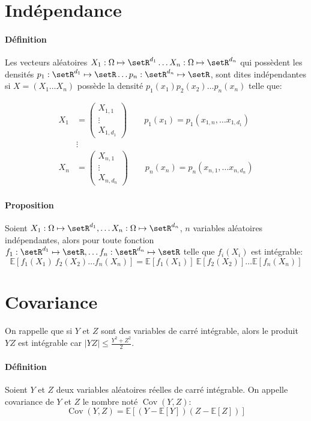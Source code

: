 \documentclass[a4paper,10pt,french,openany]{memoir}
\newcommand{\Esper}{\mathbb{E}}
\newcommand{\abs}[1]{\lvert #1 \rvert}
\newcommand{\Xonen}{X_1\dots X_n}
\DeclareMathOperator{\Cov}{Cov}
\begin{document}
\section{Indépendance}

\paragraph{Définition}
Les vecteurs aléatoires $X_1:\Omega \mapsto \setR^{d_1}\dots X_n:\Omega \mapsto \setR^{d_n}$ qui possèdent les densités $p_1:\setR^{d_1}\mapsto \setR\dots p_n:\setR^{d_n} \mapsto \setR$, sont dites indépendantes si $X=(\Xonen)$ possède la densité $p_1(x_1) p_2(x_2) \dots p_n (x_n)$ telle que:

\begin{align*}
 X_1 &= \begin{pmatrix}X_{1,1}\\\vdots\\X_{1,d_1}\end{pmatrix} \qquad p_1(x_1) = p_1(x_{1,n},\dots x_{1,d_1})\\
 & \vdots \\
 X_n &= \begin{pmatrix}X_{n,1}\\\vdots\\X_{n,d_n}\end{pmatrix} \qquad p_n(x_n) = p_n(x_{n,1},\dots x_{n,d_n})
\end{align*}

\paragraph{Proposition}
Soient $X_1:\Omega \mapsto \setR^{d_1}, \dots X_n:\Omega \mapsto \setR^{d_n}$, $n$ variables aléatoires indépendantes, alors pour toute fonction $f_1:\setR^{d_1}\mapsto \setR, \dots f_n:\setR^{d_n}\mapsto \setR$ telle que $f_i(X_i)$ est intégrable:
\[\Esper[f_1(X_1)\: f_2(X_2) \dots f_n(X_n)] = \Esper[f_1(X_1)]\: \Esper[f_2(X_2)] \dots \Esper[f_n(X_n)]\]

\section{Covariance}
On rappelle que si $Y$ et $Z$ sont des variables de carré intégrable, alors le produit $YZ$ est intégrable car $\abs{YZ}\leq\frac{Y^2 + Z^2}{2}$.

\paragraph{Définition}
Soient $Y$ et $Z$ deux variables aléatoires réelles de carré intégrable. On appelle covariance de $Y$ et $Z$ le nombre noté $\Cov(Y,Z)$:
\[ \Cov(Y,Z)=\Esper\left[(Y-\Esper[Y])(Z-\Esper[Z])\right] \]
\end{document}
